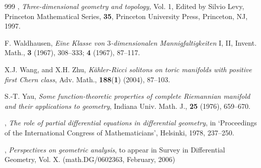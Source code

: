 \begin{thebibliography}{999}
 \bysame,
{\it Three-dimensional geometry and topology,} Vol. 1, Edited by
Silvio Levy, Princeton Mathematical Series, {\bf 35}, Princeton
University Press, Princeton, NJ, 1997.

 F. Waldhausen,
{\it Eine Klasse von $3$-dimensionalen Mannigfaltigkeiten} I, II,
Invent. Math., \textbf{3} (1967), 308--333; \textbf{4} (1967),
87--117.

 X.J. Wang, and X.H. Zhu,
{\it K\"{a}hler-Ricci solitons on toric manifolds with positive
first Chern class}, Adv. Math., \textbf{188}({\bf 1}) (2004),
87--103.

S.-T. Yau,
{\it Some function-theoretic properties of complete Riemannian
manifold and their applications to geometry}, Indiana Univ. Math.
J., \textbf{25} (1976), 659--670.

 \bysame,
{\it The role of partial differential equations in differential
geometry}, in `Proceedings of the International Congress of
Mathematicians', Helsinki, 1978, 237--250.

 \bysame,
{\it Perspectives on geometric analysis}, to appear in Survey in
Differential Geometry, Vol. X. (math.DG/0602363, February, 2006)


\end{thebibliography}
